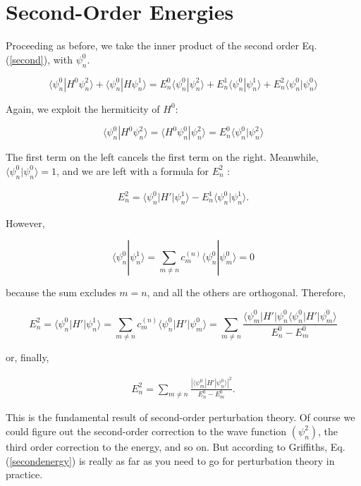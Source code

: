 \documentclass[svgnames]{article}     %
\begin{document}
\section{Second-Order Energies}

Proceeding as before, we take the inner product of the second order Eq.
(\ref{second}), with $\psi_n^0$. 

\[
\langle \psi_n^{0} | H^{0} \psi_n^2\rangle + \langle \psi_n^{0} | H \psi_n^{1}
\rangle = E_n^{0} \langle \psi_n^{0} | \psi_n^2\rangle + E_n^{1} \langle
\psi_n^{0} | \psi_n^{1} \rangle + E_n^2 \langle \psi_n^{0} | \psi_n^{0}\rangle
\] \vspace{3px}

Again, we exploit the hermiticity of $H^{0}$: 

\[
\langle \psi_n^{0} | H^{0}\psi_n^2\rangle = \langle H^{0} \psi_n^{0}|
\psi_n^2\rangle = E_n^{0} \langle \psi_n^{0}| \psi_n^2 \rangle
\] \vspace{3px}

The first term on the left cancels the first term on the right. Meanwhile,
$\langle \psi_n^{0} | \psi_n^{0} \rangle = 1$, and we are left with a formula
for $E_n^2$ : 

\begin{align} \label{}
  E_n^2 = \langle \psi_n^{0} | H' | \psi_n^{1} \rangle - E_n^{1} \langle
  \psi_n^{0} | \psi_n^{1}\rangle. 
\end{align}\vspace{3px}

However, 

\[
  \langle \psi_n^{0} | \psi_n^{1} \rangle = \sum_{m\neq n} c_m^{(n)} \langle
  \psi_n^{0} | \psi_m^{0} \rangle = 0
\] \vspace{3px}

because the sum excludes $m = n$, and all the others are orthogonal. Therefore, 

\[
E_n^2 = \langle \psi_n^{0} | H' | \psi_n^1 \rangle  = \sum_{m\neq n}^{}
c_m^{(n)} \langle \psi_n^{0} | H' | \psi_m^{0}\rangle = \sum_{m\neq n} \frac{\langle
\psi_m^{0} | H' | \psi_n^{0}\langle \psi_n^{0}|H'|\psi_m^{0}\rangle}{E_n^{0}
- E_m^{0}} 
\] \vspace{3px}

or, finally, 

\begin{tcolorbox}[title = Second-Order Energy Correction]

  \begin{align} \label{secondenergy}
    E_n^2 = \sum_{m\neq n}^{} \frac{|\langle \psi_m^{0} | H'
    | \psi_n^{0}\rangle |^2}{E_n^0 - E_m^0}. 
  \end{align}

\end{tcolorbox}

This is the fundamental result of second-order perturbation theory. Of course
we could figure out the second-order correction to the wave function
$(\psi_n^2)$, the third order correction to the energy, and so on. But
according to Griffiths, Eq. (\ref{secondenergy}) is really as far as you need
to go for perturbation theory in practice. 
\end{document}
